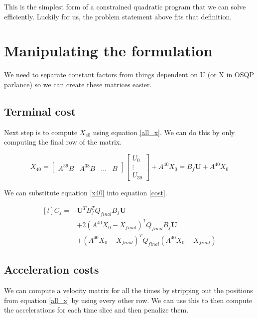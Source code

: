 \documentclass[a4paper,12pt]{article}
\begin{document}
This is the simplest form of a constrained quadratic program that we can solve efficiently.
Luckily for us, the problem statement above fits that definition.

\section{Manipulating the formulation}

We need to separate constant factors from things dependent on U (or X in OSQP parlance) so we can create these matrices easier.

\subsection{Terminal cost}

Next step is to compute $X_{40}$ using equation \ref{all_x}.
We can do this by only computing the final row of the matrix.

\begin{equation}
\label{x40}
  X_{40} = \begin{bmatrix} A^{39} B & A^{38} B & \hdots & B \end{bmatrix}
           \begin{bmatrix} U_0 \\
                           \vdots \\
                           U_{39}
           \end{bmatrix} + A^{40} X_0 = B_f \boldsymbol{U} + A^{40} X_0
\end{equation}

We can substitute equation \ref{x40} into equation \ref{cost}.

\begin{equation}
\label{final_cost}
\begin{aligned}[t]
  C_f = & \boldsymbol{U}^T B_f^T Q_{final} B_f \boldsymbol{U} \\
        & + 2 (A^{40} X_0 - X_{final})^T Q_{final} B_f \boldsymbol{U} \\
        & + (A^{40} X_0 - X_{final})^T Q_{final} (A^{40} X_0 - X_{final})
\end{aligned}
\end{equation}

\subsection{Acceleration costs}

We can compute a velocity matrix for all the times by stripping out the positions from equation \ref{all_x} by using every other row.
We can use this to then compute the accelerations for each time slice and then penalize them.
\end{document}
